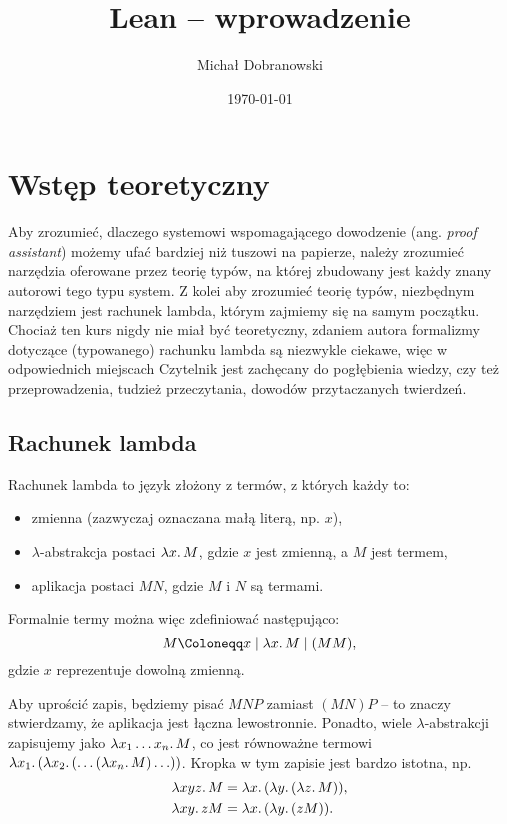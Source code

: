 \documentclass[polish,pretty]{angav}
\title{Lean -- wprowadzenie}
\author{Michał Dobranowski}
\date{\today}
\begin{document}
\maketitle
\tableofcontents
\newpage

\section{Wstęp teoretyczny}

Aby zrozumieć, dlaczego systemowi wspomagającego dowodzenie (ang. \textit{proof assistant}) możemy ufać bardziej niż tuszowi na papierze, należy zrozumieć narzędzia oferowane przez teorię typów, na której zbudowany jest każdy znany autorowi tego typu system.
Z kolei aby zrozumieć teorię typów, niezbędnym narzędziem jest rachunek lambda, którym zajmiemy się na samym początku.
Chociaż ten kurs nigdy nie miał być teoretyczny, zdaniem autora formalizmy dotyczące (typowanego) rachunku lambda są niezwykle ciekawe, więc w odpowiednich miejscach Czytelnik jest zachęcany do pogłębienia wiedzy, czy też przeprowadzenia, tudzież przeczytania, dowodów przytaczanych twierdzeń.

\subsection{Rachunek lambda}

Rachunek lambda to język złożony z termów, z których każdy to:
\begin{itemize}
    \item zmienna (zazwyczaj oznaczana małą literą, np. $x$),
    \item $\lambda$-abstrakcja postaci $\lambda x\ldotp M$, gdzie $x$ jest zmienną, a $M$ jest termem,
    \item aplikacja postaci $MN$, gdzie $M$ i $N$ są termami.
\end{itemize}

Formalnie termy można więc zdefiniować następująco:
\[ M \Coloneqq x \mid \lambda x\ldotp M \mid (MM), \]
gdzie $x$ reprezentuje dowolną zmienną.

Aby uprościć zapis, będziemy pisać $MNP$ zamiast $(MN)P$ -- to znaczy stwierdzamy, że aplikacja jest łączna lewostronnie. Ponadto, wiele $\lambda$-abstrakcji zapisujemy jako $\lambda x_1 \ldots x_n\ldotp M$, co jest równoważne termowi $\lambda x_1\ldotp (\lambda x_2\ldotp (\ldots (\lambda x_n\ldotp M) \ldots))$. Kropka w tym zapisie jest bardzo istotna, np.
\begin{align*}
    \lambda xyz\ldotp M &= \lambda x\ldotp (\lambda y\ldotp (\lambda z\ldotp M)), \\
    \lambda xy\ldotp z M &= \lambda x\ldotp (\lambda y\ldotp (z M)).
\end{align*}
\end{document}
